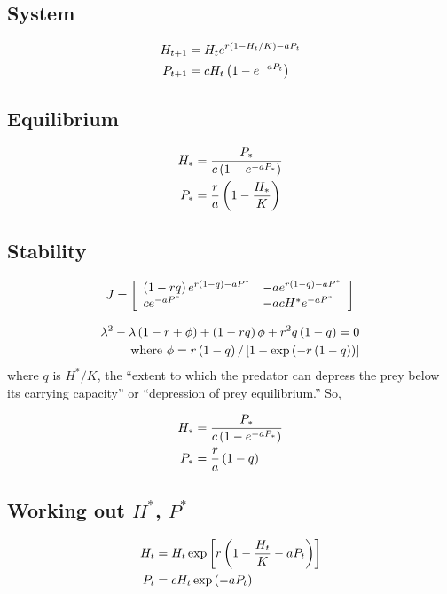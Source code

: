 \documentclass{article}
\begin{document}
\subsection{System}
\begin{align*}
H_{t+1} &= H_t e^{r \left(1-H_t/K\right) -a P_t}\\
P_{t+1} &= c H_t \left(1-e^{-a P_t}\right)
\end{align*}

\subsection{Equilibrium}
\begin{align*}
    H_* &= \frac{P_*}{c \left(1-e^{-a P_*}\right)}\\
    P_* &= \frac{r}{a} \left(1-\frac{H_*}{K}\right)
\end{align*}

\subsection{Stability}
\begin{equation*}
    J = \left[
        \begin{array}{ll}
        \left(1-rq\right)e^{r\left(1-q\right)-aP^*} &
        -a e^{r\left(1-q\right)-aP^*}\\
        ce^{-aP^*} &
        -acH^*e^{-aP^*}
        \end{array}
    \right]
\end{equation*}

\begin{align*}
    \lambda^2-\lambda \left(1-r+\phi\right) + \left(1 - rq\right)\phi + r^2q\left(1-q\right) = 0\\
    \text{where } \phi = r\left(1-q\right) / \left[1 - \exp{\left(-r\left(1-q\right)\right)}\right]
\end{align*}
where $q$ is $H^* / K$, the ``extent to which the predator can depress the prey below its carrying capacity'' or ``depression of prey equilibrium.'' So,

\begin{align*}
    H_* &= \frac{P_*}{c \left(1-e^{-aP_*}\right)}\\
    P_* &= \frac{r}{a} \left(1-q\right)
\end{align*}

\subsection{Working out $H^*$, $P^*$}
\begin{align*}
    H_t &= H_t \exp\left[r\left(1-\frac{H_t}{K}-a P_t\right)\right]\\
    P_t &= cH_t \exp\left(-aP_t\right)
\end{align*}
\end{document}
